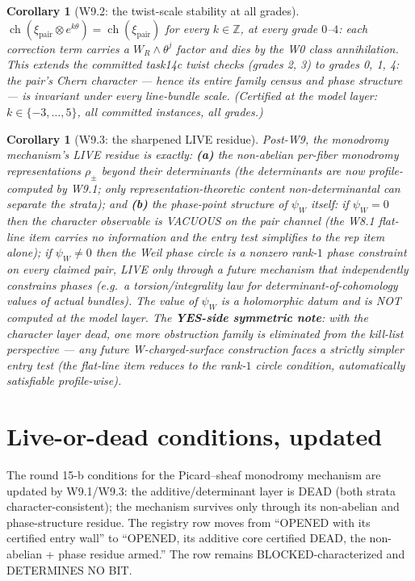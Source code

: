 \documentclass[11pt]{article}
\newtheorem{corollary}[lemma]{Corollary}
\newcommand{\WR}{W_R}
\newcommand{\ch}{\operatorname{ch}}
\begin{document}
\begin{corollary}[W9.2: the twist-scale stability at all grades]
\label{cor:W92}
$\ch(\xi_{\mathrm{pair}}\otimes e^{k\theta}) = \ch(\xi_{\mathrm{pair}})$ for
every $k\in\mathbb{Z}$, at every grade $0$--$4$: each correction term carries
a $\WR\wedge\theta^j$ factor and dies by the W0 class annihilation. This
extends the committed task14c twist checks (grades 2, 3) to grades 0, 1, 4:
the pair's Chern character --- hence its entire family census and phase
structure --- is invariant under every line-bundle scale. (Certified at the
model layer: $k\in\{-3,\dots,5\}$, all committed instances, all grades.)
\end{corollary}

\begin{corollary}[W9.3: the sharpened LIVE residue]
\label{cor:W93}
Post-W9, the monodromy mechanism's LIVE residue is exactly:
\textbf{(a)} the non-abelian per-fiber monodromy representations
$\rho_\pm$ \emph{beyond their determinants} (the determinants are now
profile-computed by W9.1; only representation-theoretic content
non-determinantal can separate the strata); and \textbf{(b)} the phase-point
structure of $\psi_W$ itself: if $\psi_W = 0$ then the character observable
is VACUOUS on the pair channel (the W8.1 flat-line item carries no
information and the entry test simplifies to the rep item alone); if
$\psi_W \ne 0$ then the Weil phase circle is a nonzero rank-$1$ phase
constraint on every claimed pair, LIVE only through a future mechanism that
independently constrains phases (e.g.\ a torsion/integrality law for
determinant-of-cohomology values of actual bundles). The value of $\psi_W$
is a holomorphic datum and is NOT computed at the model layer. The
\textbf{YES-side symmetric note}: with the character layer dead, one more
obstruction family is eliminated from the kill-list perspective --- any
future W-charged-surface construction faces a strictly simpler entry test
(the flat-line item reduces to the rank-$1$ circle condition,
automatically satisfiable profile-wise).
\end{corollary}

\section{Live-or-dead conditions, updated}

The round 15-b conditions for the Picard--sheaf monodromy mechanism are
updated by W9.1/W9.3: the additive/determinant layer is DEAD (both strata
character-consistent); the mechanism survives only through its non-abelian
and phase-structure residue. The registry row moves from ``OPENED with its
certified entry wall'' to ``OPENED, its additive core certified DEAD, the
non-abelian + phase residue armed.'' The row remains BLOCKED-characterized
and DETERMINES NO BIT.
\end{document}
